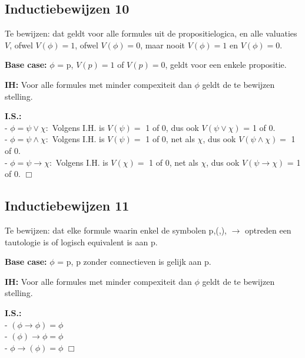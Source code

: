 \documentclass[11pt]{article}
\begin{document}
\pagebreak

\subsection*{Inductiebewijzen 10}
Te bewijzen: dat geldt voor alle formules uit de propositielogica, en alle
valuaties $V$, ofwel $V(\phi)=1$, ofwel $V(\phi)=0$, maar nooit $V(\phi)=1$ en
$V(\phi)=0$.

\textbf{Base case:} $\phi$ = p, $V(p)=1$ of $V(p)=0$, geldt voor een enkele
propositie.

\textbf{IH:} Voor alle formules met minder compexiteit dan $\phi$ geldt de te
bewijzen stelling.

\textbf{I.S.:} \\
- $\phi = \psi \vee \chi:$ Volgens I.H. is $V(\psi)=$ 1 of 0, dus ook $V(\psi
\vee \chi)$ = 1 of 0.\\
- $\phi = \psi \wedge \chi:$ Volgens I.H. is $V(\psi)=$ 1 of 0, net als $\chi$,
dus ook $V (\psi \wedge \chi)=$ 1 of 0.\\
- $\phi = \psi \rightarrow \chi:$ Volgens I.H. is $V(\chi)=$ 1 of 0, net als
$\chi$, dus ook $V(\psi \rightarrow \chi)$ = 1 of 0.
\hfill $\Box$


\subsection*{Inductiebewijzen 11}
Te bewijzen: dat elke formule waarin enkel de symbolen p,(,), $\rightarrow$ optreden een tautologie is of logisch equivalent is aan p.

\textbf{Base case:} $\phi$ = p, p zonder connectieven is gelijk aan p.

\textbf{IH:} Voor alle formules met minder compexiteit dan $\phi$ geldt de te
bewijzen stelling.

\textbf{I.S.:} \\
- $(\phi \rightarrow \phi) = \phi$ \\
- $(\phi) \rightarrow \phi = \phi$ \\
- $\phi \rightarrow (\phi) = \phi$
\hfill $\Box$

\end{document}
